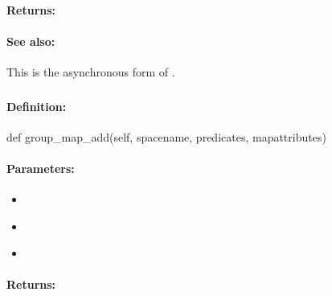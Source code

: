 \paragraph{Returns:}


\paragraph{See also:}  This is the asynchronous form of .

\pagebreak
\subsubsection{}
\label{api:python:group_map_add}


\paragraph{Definition:}
\begin{pythoncode}
def group_map_add(self, spacename, predicates, mapattributes)
\end{pythoncode}

\paragraph{Parameters:}
\begin{itemize}[noitemsep]
\item {}\\

\item {}\\

\item {}\\

\end{itemize}

\paragraph{Returns:}


\pagebreak
\subsubsection{}
\label{api:python:async_group_map_add}


